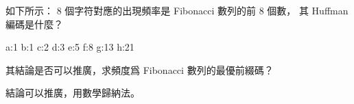 \startEXERCISE
如下所示： 8 個字符對應的出現頻率是 Fibonacci 數列的前 8 個數，
其 Huffman 編碼是什麼？

a:1 b:1 c:2 d:3 e:5 f:8 g:13 h:21

其結論是否可以推廣，求頻度爲 Fibonacci 數列的最優前綴碼？
\stopEXERCISE

\startANSWER
結論可以推廣，用數學歸納法。

\externalfigure[e15_3_3-1]
\stopANSWER

